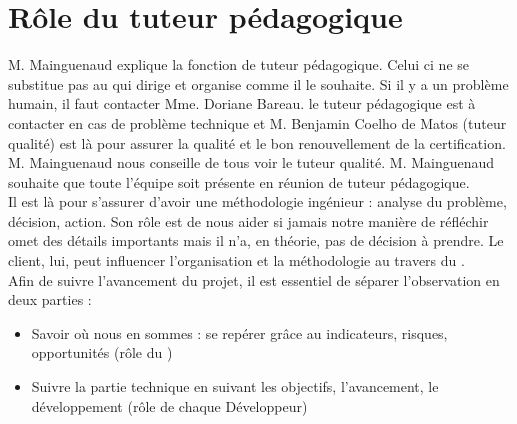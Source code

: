 \documentclass [a4paper] {article}
\begin{document}
\section{Rôle du tuteur pédagogique}
M. Mainguenaud explique la fonction de tuteur pédagogique.
Celui ci ne se substitue pas au \CP{} qui dirige et organise comme il le souhaite.
Si il y a un problème humain, il faut contacter Mme. Doriane Bareau. le tuteur pédagogique est à contacter en cas de problème technique et M. Benjamin Coelho de Matos (tuteur qualité) est là pour assurer la qualité et le bon renouvellement de la certification. M. Mainguenaud nous conseille de tous voir le tuteur qualité.
M. Mainguenaud souhaite que toute l'équipe soit présente en réunion de tuteur pédagogique.
\\
Il est là pour s'assurer d'avoir une méthodologie ingénieur : analyse du problème, décision, action. Son rôle est de nous aider si jamais notre manière de réfléchir omet des détails importants mais il n'a, en théorie, pas de décision à prendre.
Le client, lui, peut influencer l'organisation et la méthodologie au travers du \PQCourt .
\\
Afin de suivre l'avancement du projet, il est essentiel de séparer l'observation en deux parties :
\begin{itemize}
\item Savoir où nous en sommes : se repérer grâce au indicateurs, risques, opportunités (rôle du \RQCourt)
\item Suivre la partie technique en suivant les objectifs, l'avancement, le développement (rôle de chaque Développeur)
\end{itemize}
\end{document}
